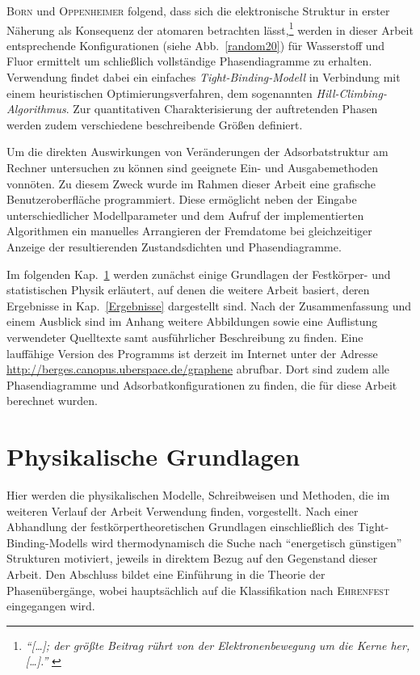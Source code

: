 \documentclass[a4paper, 10pt, twoside, openany]{book} %
\begin{document}
\textsc{Born} und \textsc{Oppenheimer} folgend, dass sich die elektronische Struktur in erster Näherung als Konsequenz der atomaren betrachten lässt,\footnote{\emph{"`\emph{[\dots]}; der größte Beitrag rührt von der Elektronenbewegung um die Kerne her, \emph{[\dots]}."'} \cite[S.~457]{Born}} werden in dieser Arbeit entsprechende Konfigurationen (siehe Abb.~\ref{random20}) für Wasserstoff und Fluor ermittelt um schließlich vollständige Phasendiagramme zu erhalten. Verwendung findet dabei ein einfaches \emph{Tight-Binding-Modell} in Verbindung mit einem heuristischen Optimierungsverfahren, dem sogenannten \emph{Hill-Climbing-Algorithmus}. Zur quantitativen Charakterisierung der auftretenden Phasen werden zudem verschiedene beschreibende Größen definiert.

Um die direkten Auswirkungen von Veränderungen der Adsorbatstruktur am Rechner untersuchen zu können sind geeignete Ein- und Ausgabemethoden vonnöten. Zu diesem Zweck wurde im Rahmen dieser Arbeit eine grafische Benutzeroberfläche programmiert. Diese ermöglicht neben der Eingabe unterschiedlicher Modellparameter und dem Aufruf der implementierten Algorithmen ein manuelles Arrangieren der Fremdatome bei gleichzeitiger Anzeige der resultierenden Zustandsdichten und Phasendiagramme.

Im folgenden Kap.~\ref{Theorie} werden zunächst einige Grundlagen der Festkörper- und statistischen Physik erläutert, auf denen die weitere Arbeit basiert, deren Ergebnisse in Kap.~\ref{Ergebnisse} dargestellt sind. Nach der Zusammenfassung und einem Ausblick sind im Anhang weitere Abbildungen sowie eine Auflistung verwendeter Quelltexte samt ausführlicher Beschreibung zu finden. Eine lauffähige Version des Programms ist derzeit im Internet unter der Adresse \url{http://berges.canopus.uberspace.de/graphene} abrufbar. Dort sind zudem alle Phasendiagramme und Adsorbatkonfigurationen zu finden, die für diese Arbeit berechnet wurden.

\chapter{Physikalische Grundlagen}
\label{Theorie}

Hier werden die physikalischen Modelle, Schreibweisen und Methoden, die im weiteren Verlauf der Arbeit Verwendung finden, vorgestellt. Nach einer Abhandlung der festkörpertheoretischen Grundlagen einschließlich des Tight-Binding-Modells wird thermodynamisch die Suche nach "`energetisch günstigen"' Strukturen motiviert, jeweils in direktem Bezug auf den Gegenstand dieser Arbeit. Den Abschluss bildet eine Einführung in die Theorie der Phasenübergänge, wobei hauptsächlich auf die Klassifikation nach \textsc{Ehrenfest} eingegangen wird.
\end{document}
